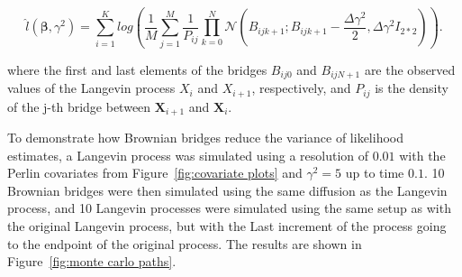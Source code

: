 $$
\hat{l}(\bm \beta, \gamma^2) = \sum_{i = 1}^K log( \frac{1}{M}\sum_{j=1}^M \frac{1}{P_{ij}}\prod_{k=0}^N \mathcal{N}(B_{ijk+1} ; B_{ijk+1} - \frac{\Delta \gamma^2}{2}, \Delta\gamma^2 I_{2*2})).
$$

where the first and last elements of the bridges $B_{ij0}$ and $B_{ijN+1}$ are the observed values of the Langevin process $X_i$ and $X_{i+1}$, respectively, and $P_{ij}$ is the density of the j-th bridge between $\textbf{X}_{i+1}$ and $\textbf{X}_i$.


To demonstrate how Brownian bridges reduce the variance of likelihood estimates, a Langevin process was simulated using a resolution of $0.01$ with the Perlin covariates from Figure~\ref{fig:covariate plots} and $\gamma^2 = 5$ up to time $0.1$. 10 Brownian bridges were then simulated using the same diffusion as the Langevin process, and 10 Langevin processes were simulated using the same setup as with the original Langevin process, but with the Last increment of the process going to the endpoint of the original process. The results are shown in Figure~\ref{fig:monte carlo paths}. 


